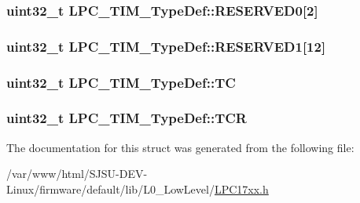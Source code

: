 \subsubsection[{\texorpdfstring{R\+E\+S\+E\+R\+V\+E\+D0}{RESERVED0}}]{\setlength{\rightskip}{0pt plus 5cm}uint32\+\_\+t L\+P\+C\+\_\+\+T\+I\+M\+\_\+\+Type\+Def\+::\+R\+E\+S\+E\+R\+V\+E\+D0\mbox{[}2\mbox{]}}\hypertarget{structLPC__TIM__TypeDef_a3e38bb184d8223f0f99f9534c1b7bb19}{}\label{structLPC__TIM__TypeDef_a3e38bb184d8223f0f99f9534c1b7bb19}
\subsubsection[{\texorpdfstring{R\+E\+S\+E\+R\+V\+E\+D1}{RESERVED1}}]{\setlength{\rightskip}{0pt plus 5cm}uint32\+\_\+t L\+P\+C\+\_\+\+T\+I\+M\+\_\+\+Type\+Def\+::\+R\+E\+S\+E\+R\+V\+E\+D1\mbox{[}12\mbox{]}}\hypertarget{structLPC__TIM__TypeDef_a52cad77d7054e9043968f92dc7715662}{}\label{structLPC__TIM__TypeDef_a52cad77d7054e9043968f92dc7715662}
\subsubsection[{\texorpdfstring{TC}{TC}}]{ uint32\+\_\+t L\+P\+C\+\_\+\+T\+I\+M\+\_\+\+Type\+Def\+::\+TC}\hypertarget{structLPC__TIM__TypeDef_a2d70cc897d39c22a04328fc329790fa2}{}\label{structLPC__TIM__TypeDef_a2d70cc897d39c22a04328fc329790fa2}
\subsubsection[{\texorpdfstring{T\+CR}{TCR}}]{ uint32\+\_\+t L\+P\+C\+\_\+\+T\+I\+M\+\_\+\+Type\+Def\+::\+T\+CR}\hypertarget{structLPC__TIM__TypeDef_a749720c431746c0e08fa59c2ebb1ca26}{}\label{structLPC__TIM__TypeDef_a749720c431746c0e08fa59c2ebb1ca26}


The documentation for this struct was generated from the following file\+:\begin{DoxyCompactItemize}
\item 
/var/www/html/\+S\+J\+S\+U-\/\+D\+E\+V-\/\+Linux/firmware/default/lib/\+L0\+\_\+\+Low\+Level/\hyperlink{LPC17xx_8h}{L\+P\+C17xx.\+h}\end{DoxyCompactItemize}
